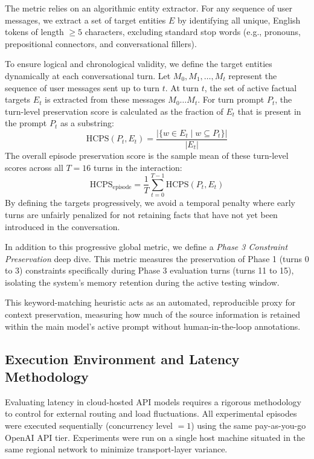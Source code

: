 \documentclass[11pt,journal,onecolumn]{article}
\begin{document}
The metric relies on an algorithmic entity extractor. For any sequence of user messages, we extract a set of target entities $E$ by identifying all unique, English tokens of length $\ge 5$ characters, excluding standard stop words (e.g., pronouns, prepositional connectors, and conversational fillers).

To ensure logical and chronological validity, we define the target entities dynamically at each conversational turn. Let $M_0, M_1, \dots, M_t$ represent the sequence of user messages sent up to turn $t$. At turn $t$, the set of active factual targets $E_t$ is extracted from these messages $M_0 \dots M_t$. For turn prompt $P_t$, the turn-level preservation score is calculated as the fraction of $E_t$ that is present in the prompt $P_t$ as a substring:
\begin{equation}
\text{HCPS}(P_t, E_t) = \frac{|\{w \in E_t \mid w \subseteq P_t\}|}{|E_t|}
\end{equation}
The overall episode preservation score is the sample mean of these turn-level scores across all $T = 16$ turns in the interaction:
\begin{equation}
\text{HCPS}_{\text{episode}} = \frac{1}{T} \sum_{t=0}^{T-1} \text{HCPS}(P_t, E_t)
\end{equation}
By defining the targets progressively, we avoid a temporal penalty where early turns are unfairly penalized for not retaining facts that have not yet been introduced in the conversation.

In addition to this progressive global metric, we define a \textit{Phase 3 Constraint Preservation} deep dive. This metric measures the preservation of Phase 1 (turns 0 to 3) constraints specifically during Phase 3 evaluation turns (turns 11 to 15), isolating the system's memory retention during the active testing window.

This keyword-matching heuristic acts as an automated, reproducible proxy for context preservation, measuring how much of the source information is retained within the main model's active prompt without human-in-the-loop annotations.

\subsection{Execution Environment and Latency Methodology}
Evaluating latency in cloud-hosted API models requires a rigorous methodology to control for external routing and load fluctuations. All experimental episodes were executed sequentially (concurrency level $= 1$) using the same pay-as-you-go OpenAI API tier. Experiments were run on a single host machine situated in the same regional network to minimize transport-layer variance. 
\end{document}
